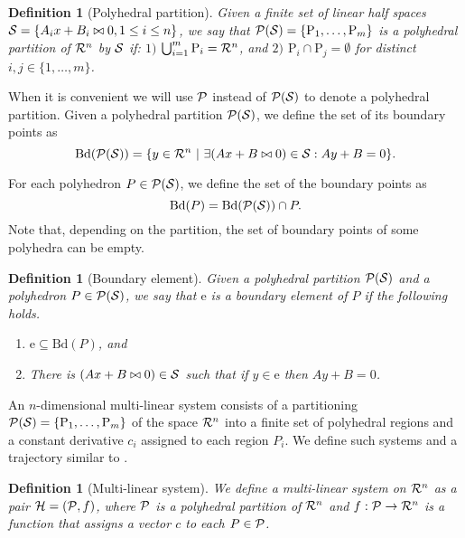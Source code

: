 \documentclass[copyright,creativecommons]{packages/eptcs}
\newcommand{\bd}{{\mbox{Bd}}}
\newcommand{\p}{{\mbox{P}}}
\newcommand{\br}{{\mbox{Bd}}}
\newcommand{\be}{\mbox{e}}
\newtheorem{definition}[theorem]{Definition}
\begin{document}
\begin{definition}[Polyhedral partition] Given a finite set of linear half spaces 
${\cal S}=\{A_ix+B_i \bowtie 0, 1\leq i \leq n\}$, we say that ${\cal{P}}({\cal S})=\{\p_1, \dots, \p_m\}$ is a polyhedral partition of  ${\cal{R}}^{n}$  by ${\cal S}$ if:  
$1)$ $\bigcup_{i=1}^m \p_i={\cal{R}}^{n}$, and $2)$   $\p_i\cap\p_j=\emptyset$ for distinct $i,j\in\{1,\dots, m\}$.
\end{definition}
When it is convenient we will use $\cal{P}$ instead of ${\cal{P}}({\cal S})$ to denote a polyhedral partition. 
Given a polyhedral partition $\cal{P}({\cal S})$,  we define  the  set of its  boundary points  as  
\[\br({\cal{P}}({\cal S}))=\{y \in{\cal{R}}^{n} ~|~\exists (Ax+B \bowtie 0)\in {\cal S}: Ay+B=0\}.\] 


For each polyhedron $P\in {\cal P}({\cal S})$, we define the set of the boundary points as \[\br(P)=\br({\cal{P}}({\cal S}))\cap P.\]
Note that, depending on the partition,   the set of boundary points of  some polyhedra can be empty. 

\begin{definition}[Boundary element]
 Given a polyhedral partition ${\cal P} ({\cal S})$ and a polyhedron $P\in {\cal P} ({\cal S})$, we say that $\be$ is a boundary element of $P$ if the following holds.
\begin{enumerate}
 \item[(1)] $\be\subseteq \bd(P)$, and  
 \item[(2)] There is  $(Ax+B \bowtie 0)\in {\cal S}$ such that if  $y\in \be$ then $Ay+B=0$.
\end{enumerate}

\end{definition}



An $n$-dimensional  multi-linear system consists of a partitioning ${\cal{P}}({\cal S})=\{\p_1, \dots, \p_m\}$ of the space ${\cal{R}}^{n}$
 into a finite set of polyhedral regions  and a constant derivative $c_i$  assigned to each region $P_i$. 
We define such systems and a trajectory similar to \cite{MP93}.


\begin{definition}[Multi-linear system] We define a  multi-linear system   on ${\cal{R}}^{n}$ as
a pair ${\cal H}=({\cal P},f)$, where $\cal P$ 
is a polyhedral partition of ${\cal{R}}^{n}$ and  $f:{\cal P}\rightarrow {\cal{R}}^{n}$ is a function that assigns a vector $c$ to each $P\in\cal P$.  
\end{definition}
\end{document}
